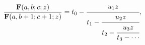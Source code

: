 \[\frac{\mathop{\mathbf{F}\/}\nolimits\!\left(a,b;c;z\right)}{\mathop{\mathbf{F}%
\/}\nolimits\!\left(a,b+1;c+1;z\right)}=t_{0}-\cfrac{u_{1}z}{t_{1}-\cfrac{u_{2%
}z}{t_{2}-\cfrac{u_{3}z}{t_{3}-\cdots}}},\]